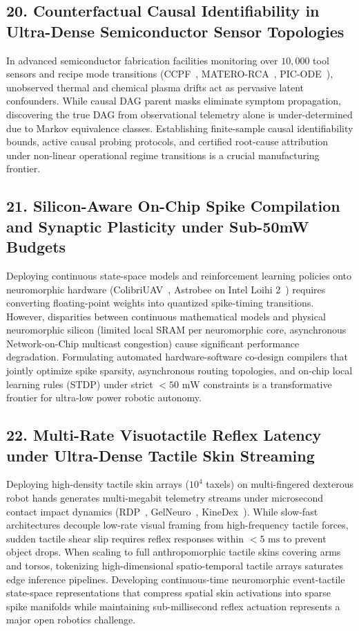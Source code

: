\subsection{20. Counterfactual Causal Identifiability in Ultra-Dense Semiconductor Sensor Topologies}
In advanced semiconductor fabrication facilities monitoring over $10{,}000$ tool sensors and recipe mode transitions (CCPF~\cite{Zhang2026CCPF}, MATERO-RCA~\cite{Liu2026MATERO}, PIC-ODE~\cite{Dong2026PICODE}), unobserved thermal and chemical plasma drifts act as pervasive latent confounders. While causal DAG parent masks eliminate symptom propagation, discovering the true DAG from observational telemetry alone is under-determined due to Markov equivalence classes. Establishing finite-sample causal identifiability bounds, active causal probing protocols, and certified root-cause attribution under non-linear operational regime transitions is a crucial manufacturing frontier.

\subsection{21. Silicon-Aware On-Chip Spike Compilation and Synaptic Plasticity under Sub-50mW Budgets}
Deploying continuous state-space models and reinforcement learning policies onto neuromorphic hardware (ColibriUAV~\cite{Renner2023Colibri}, Astrobee on Intel Loihi 2~\cite{Stewart2025Astrobee}) requires converting floating-point weights into quantized spike-timing transitions. However, disparities between continuous mathematical models and physical neuromorphic silicon (limited local SRAM per neuromorphic core, asynchronous Network-on-Chip multicast congestion) cause significant performance degradation. Formulating automated hardware-software co-design compilers that jointly optimize spike sparsity, asynchronous routing topologies, and on-chip local learning rules (STDP) under strict $<50\text{ mW}$ constraints is a transformative frontier for ultra-low power robotic autonomy.

\subsection{22. Multi-Rate Visuotactile Reflex Latency under Ultra-Dense Tactile Skin Streaming}
Deploying high-density tactile skin arrays ($10^4$ taxels) on multi-fingered dexterous robot hands generates multi-megabit telemetry streams under microsecond contact impact dynamics (RDP~\cite{Xue2025RDP}, GelNeuro~\cite{Bian2026GelNeuro}, KineDex~\cite{Zhang2025KineDex}). While slow-fast architectures decouple low-rate visual framing from high-frequency tactile forces, sudden tactile shear slip requires reflex responses within $<5\text{ ms}$ to prevent object drops. When scaling to full anthropomorphic tactile skins covering arms and torsos, tokenizing high-dimensional spatio-temporal tactile arrays saturates edge inference pipelines. Developing continuous-time neuromorphic event-tactile state-space representations that compress spatial skin activations into sparse spike manifolds while maintaining sub-millisecond reflex actuation represents a major open robotics challenge.


